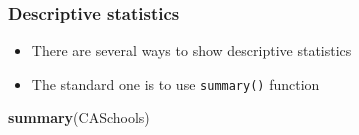 \documentclass[]{book}
\newenvironment{Shaded}{\begin{snugshade}}{\end{snugshade}}
\newcommand{\KeywordTok}[1]{\textcolor[rgb]{0.13,0.29,0.53}{\textbf{#1}}}
\newcommand{\DataTypeTok}[1]{\textcolor[rgb]{0.13,0.29,0.53}{#1}}
\newcommand{\DecValTok}[1]{\textcolor[rgb]{0.00,0.00,0.81}{#1}}
\newcommand{\StringTok}[1]{\textcolor[rgb]{0.31,0.60,0.02}{#1}}
\newcommand{\OperatorTok}[1]{\textcolor[rgb]{0.81,0.36,0.00}{\textbf{#1}}}
\newcommand{\NormalTok}[1]{#1}
\providecommand{\tightlist}{%
  \setlength{\itemsep}{0pt}\setlength{\parskip}{0pt}}
\begin{document}
\begin{Shaded}
\end{Shaded}

\subsubsection{Descriptive statistics}\label{descriptive-statistics}

\begin{itemize}
\tightlist
\item
  There are several ways to show descriptive statistics
\item
  The standard one is to use \texttt{summary()} function
\end{itemize}

\begin{Shaded}
\begin{Highlighting}[]
\KeywordTok{summary}\NormalTok{(CASchools)}
\end{Highlighting}
\end{Shaded}
\end{document}
